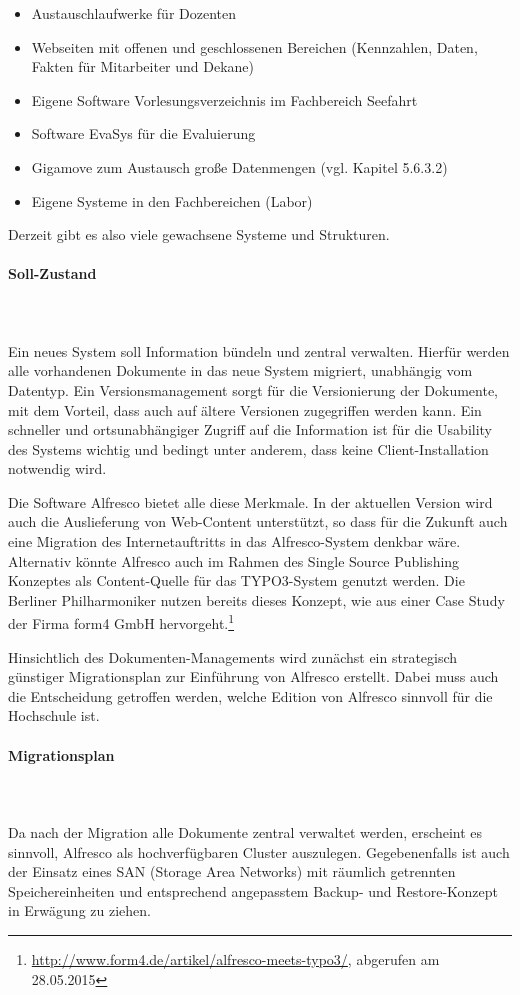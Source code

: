 \begin{itemize}
	\item Austauschlaufwerke für Dozenten
	\item Webseiten mit offenen und geschlossenen Bereichen (Kennzahlen, Daten, Fakten für Mitarbeiter und Dekane)
	\item Eigene Software Vorlesungsverzeichnis im Fachbereich Seefahrt
	\item Software EvaSys für die Evaluierung
	\item Gigamove zum Austausch große Datenmengen (vgl. Kapitel 5.6.3.2)
	\item Eigene Systeme in den Fachbereichen (Labor)	
\end{itemize}

Derzeit gibt es also viele gewachsene Systeme und Strukturen.

\paragraph{Soll-Zustand}\mbox{}\\\\
Ein neues System soll Information bündeln und zentral verwalten. Hierfür werden alle vorhandenen Dokumente in das neue System migriert, unabhängig vom Datentyp. Ein Versionsmanagement sorgt für die Versionierung der Dokumente, mit dem Vorteil, dass auch auf ältere Versionen zugegriffen werden kann. Ein schneller und ortsunabhängiger Zugriff auf die Information ist für die Usability des Systems wichtig und bedingt unter anderem, dass keine Client-Installation notwendig wird.

Die Software Alfresco bietet alle diese Merkmale. In der aktuellen Version wird auch die Auslieferung von Web-Content unterstützt, so dass für die Zukunft auch eine Migration des Internetauftritts in das Alfresco-System denkbar wäre. Alternativ könnte Alfresco auch im Rahmen des Single Source Publishing Konzeptes als Content-Quelle für das TYPO3-System genutzt werden. Die Berliner Philharmoniker nutzen bereits dieses Konzept, wie aus einer Case Study der Firma form4 GmbH hervorgeht.\footnote{\url{http://www.form4.de/artikel/alfresco-meets-typo3/}, abgerufen am 28.05.2015}

Hinsichtlich des Dokumenten-Managements wird zunächst ein strategisch günstiger Migrationsplan zur Einführung von Alfresco erstellt. Dabei muss auch die Entscheidung getroffen werden, welche Edition von Alfresco sinnvoll für die Hochschule ist.

\paragraph{Migrationsplan}\mbox{}\\\\
Da nach der Migration alle Dokumente zentral verwaltet werden, erscheint es sinnvoll, Alfresco als hochverfügbaren Cluster auszulegen. Gegebenenfalls ist auch der Einsatz eines SAN (Storage Area Networks) mit räumlich getrennten Speichereinheiten und entsprechend angepasstem Backup- und Restore-Konzept in Erwägung zu ziehen.

